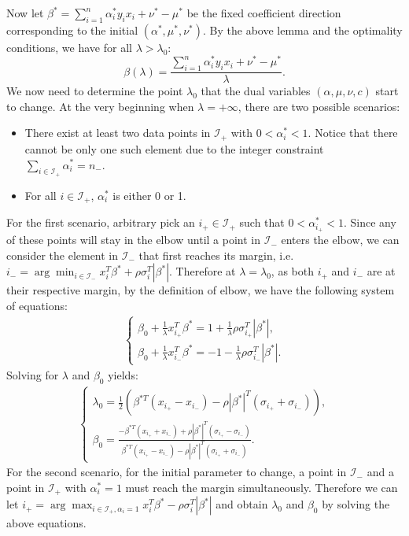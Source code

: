 \documentclass[10pt]{article}
\theoremstyle{definition}
\begin{document}
Now let $\beta^* = \sum_{i=1}^n \alpha_i^* y_i x_i + \nu^* - \mu^*$ be the fixed coefficient direction corresponding to the initial $(\alpha^*,\mu^*,\nu^*)$. By the above lemma and the optimality conditions, we have for all $\lambda>\lambda_0$:
\[\beta(\lambda) = \frac{\sum_{i=1}^n \alpha_i^* y_i x_i + \nu^* - \mu^*}{\lambda}.\]
We now need to determine the point $\lambda_0$ that the dual variables $(\alpha,\mu,\nu,c)$ start to change. At the very beginning when $\lambda=+\infty$, there are two possible scenarios:
\begin{itemize}
\item There exist at least two data points in $\mathcal I_+$ with $0<\alpha_i^*<1$. Notice that there cannot be only one such element due to the integer constraint $\sum_{i\in \mathcal I_+} \alpha_i^* = n_-$. 
\item For all $i\in \mathcal I_+$, $\alpha_i^*$ is either 0 or 1.
\end{itemize}
For the first scenario, arbitrary pick an $i_+ \in \mathcal I_+$ such that $0<\alpha_{i_+}^*<1$. Since any of these points will stay in the elbow until a point in $\mathcal I_-$ enters the elbow, we can consider the element in $\mathcal I_-$ that first reaches its margin, i.e. $i_- = \arg \min_{i \in \mathcal I_-} x_i^T\beta^* + \rho \sigma_i^T|\beta^*|$. Therefore at $\lambda=\lambda_0$, as both $i_+$ and $i_-$ are at their respective margin, by the definition of elbow, we have the following system of equations:
\begin{align*}
\begin{cases}
\beta_0+\frac{1}{\lambda}x_{i_+}^T\beta^* =  1+\frac{1}{\lambda}\rho \sigma_{i_+}^T|\beta^*|,\\
\beta_0+\frac{1}{\lambda}x_{i_-}^T\beta^* =  -1-\frac{1}{\lambda}\rho \sigma_{i_-}^T|\beta^*|.
\end{cases}
\end{align*}
Solving for $\lambda$ and $\beta_0$ yields:
\begin{align}
\begin{cases}
\lambda_0 = \frac{1}{2}(\beta^{*T}(x_{i_+}-x_{i_-})-\rho|\beta^*|^T(\sigma_{i_+}+\sigma_{i_-})),\\
\beta_0 = \frac{-\beta^{*T}(x_{i_+}+x_{i_-})+\rho|\beta^*|^T(\sigma_{i_+}-\sigma_{i_-})}{\beta^{*T}(x_{i_+}-x_{i_-})-\rho|\beta^*|^T(\sigma_{i_+}+\sigma_{i_-})}.
\end{cases}
\end{align}
For the second scenario, for the initial parameter to change, a point in $\mathcal I_-$ and a point in $\mathcal I_+$ with $\alpha_i^* = 1$ must reach the margin simultaneously. Therefore we can let $i_+ = \arg \max_{i\in \mathcal I_+, \alpha_i=1} x_i^T\beta^* - \rho \sigma_i^T|\beta^*|$ and obtain $\lambda_0$ and $\beta_0$ by solving the above equations.\\
\end{document}
